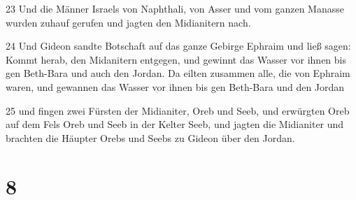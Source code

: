 \par 23 Und die Männer Israels von Naphthali, von Asser und vom ganzen Manasse wurden zuhauf gerufen und jagten den Midianitern nach.
\par 24 Und Gideon sandte Botschaft auf das ganze Gebirge Ephraim und ließ sagen: Kommt herab, den Midanitern entgegen, und gewinnt das Wasser vor ihnen bis gen Beth-Bara und auch den Jordan. Da eilten zusammen alle, die von Ephraim waren, und gewannen das Wasser vor ihnen bis gen Beth-Bara und den Jordan
\par 25 und fingen zwei Fürsten der Midianiter, Oreb und Seeb, und erwürgten Oreb auf dem Fels Oreb und Seeb in der Kelter Seeb, und jagten die Midianiter und brachten die Häupter Orebs und Seebs zu Gideon über den Jordan.

\chapter{8}

